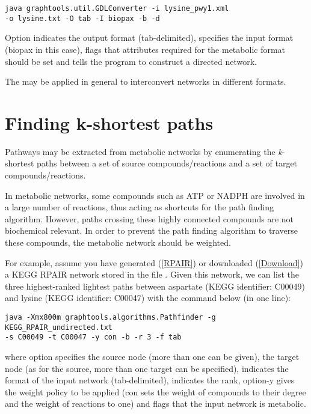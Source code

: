 \begin{lstlisting}
java graphtools.util.GDLConverter -i lysine_pwy1.xml 
-o lysine.txt -O tab -I biopax -b -d
\end{lstlisting}

Option  indicates the output format (tab-delimited), 
specifies the input format (biopax in this case),  flags that
attributes required for the metabolic format should be set and  tells
the program to construct a directed network.

The  may be applied in general to interconvert networks
in different formats.

\section{Finding k-shortest paths}

Pathways may be extracted from metabolic networks by enumerating the
\textit{k}-shortest paths between a set of source compounds/reactions and a
set of target compounds/reactions.

In metabolic networks, some compounds such as ATP or NADPH are involved in a
large number of reactions, thus acting as shortcuts for the path finding
algorithm. However, paths crossing these highly connected compounds are not
biochemical relevant. In order to prevent the path finding algorithm to traverse
these compounds, the metabolic network should be weighted.

For example, assume you have generated (\ref{RPAIR}) or downloaded
(\ref{Download}) a KEGG RPAIR network stored in the file 
. Given this network, we can list the 
three highest-ranked lightest paths between
aspartate (KEGG identifier: C00049) and lysine (KEGG identifier: C00047) with
the command below (in one line):

\begin{lstlisting}
java -Xmx800m graphtools.algorithms.Pathfinder -g KEGG_RPAIR_undirected.txt 
-s C00049 -t C00047 -y con -b -r 3 -f tab
\end{lstlisting}

where option  specifies the source node (more than one can be given),
 the target node (as for the source, more than one target can be
specified), indicates the format of the input network
(tab-delimited),  indicates the rank, option{-y} gives the weight policy to be applied
(con sets the weight of compounds to their degree and the weight of reactions
to one) and  flags that the input network is metabolic.

